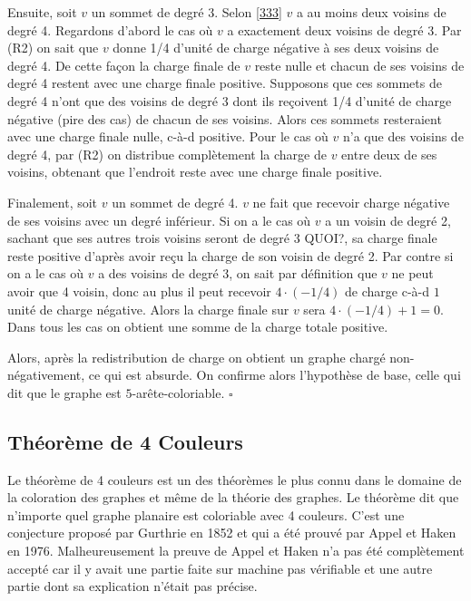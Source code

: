 \documentclass[10pt,a4paper]{article}
\newcommand{\ep}{{\hfill $\square$}}
\begin{document}
Ensuite, soit $v$ un sommet de degré 3. Selon \ref{333} $v$ a au moins deux voisins de degré 4. Regardons d'abord le cas où $v$ a exactement deux voisins de degré 3. Par (R2) on sait que $v$ donne 1/4 d'unité de charge négative à ses deux voisins de degré 4. De cette façon la charge finale de $v$ reste nulle et chacun de ses voisins de degré 4 restent avec une charge finale positive. Supposons que ces sommets de degré 4 n'ont que des voisins de degré 3 dont ils reçoivent 1/4 d'unité de charge négative (pire des cas) de chacun de ses voisins. Alors ces sommets resteraient avec une charge finale nulle, c-à-d positive. Pour le cas où $v$ n'a que des voisins de degré 4, par (R2) on distribue complètement la charge de $v$ entre deux de ses voisins, obtenant que l'endroit reste avec une charge finale positive.

Finalement, soit $v$ un sommet de degré 4. $v$ ne fait que recevoir charge négative de ses voisins avec un degré inférieur. Si on a le cas où $v$ a un voisin de degré 2, sachant que ses autres trois voisins seront de degré 3 {\color{blue} QUOI?}, sa charge finale reste positive d'après avoir reçu la charge de son voisin de degré 2. Par contre si on a le cas où $v$ a des voisins de degré 3, on sait par définition que $v$ ne peut avoir que 4 voisin, donc au plus il peut recevoir $4 \cdot (-1/4)$ de charge c-à-d $1$ unité de charge négative. Alors la charge finale sur $v$ sera $4\cdot(-1/4) + 1 = 0$. Dans tous les cas on obtient une somme de la charge totale positive.

Alors, après la redistribution de charge on obtient un graphe chargé non-négativement, ce qui est absurde. On confirme alors l'hypothèse de base, celle qui dit que le graphe est $5$-arête-coloriable.
\ep 


\subsection{Théorème de 4 Couleurs}

Le théorème de 4 couleurs est un des théorèmes le plus connu dans le domaine de la coloration des graphes et même de la théorie des graphes. Le théorème dit que n'importe quel graphe planaire est coloriable avec 4 couleurs. C'est une conjecture proposé par Gurthrie en 1852 et qui a été prouvé par Appel et Haken en 1976. Malheureusement la preuve de Appel et Haken n'a pas été complètement accepté car il y avait une partie faite sur machine pas vérifiable et une autre partie dont sa explication n'était pas précise.
\end{document}
